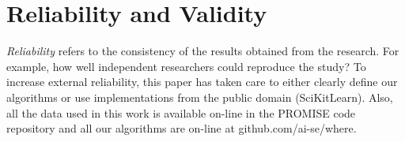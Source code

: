 \documentclass{sig-alternative}
\begin{document}


\section{Reliability and Validity}\label{sect:construct}


{\em Reliability} refers to the consistency of the results obtained
from the research.  For example,   how well independent researchers
could reproduce the study? To increase external
reliability, this paper has taken care to either  clearly define our
algorithms or use implementations from the public domain
(SciKitLearn). Also, all the data used in this work is available
on-line in the PROMISE code repository and all our algorithms
are on-line at github.com/ai-se/where.
\end{document}
